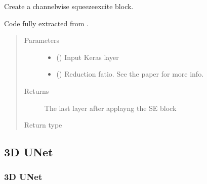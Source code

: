 \documentclass[letterpaper,10pt,english]{sphinxmanual}
\begin{document}
\begin{fulllineitems}
\label{\detokenize{models/se_unet_2d:models.se_unet_2d.squeeze_excite_block}}
Create a channel\sphinxhyphen{}wise squeeze\sphinxhyphen{}excite block.

Code fully extracted from .
\begin{quote}\begin{description}
\item[{Parameters}] \leavevmode\begin{itemize}
\item {} 
 () \textendash{} Input Keras layer

\item {} 
 () \textendash{} Reduction fatio. See the paper for more info.

\end{itemize}

\item[{Returns}] \leavevmode
{} \textendash{} The last layer after applayng the SE block

\item[{Return type}] \leavevmode
{}

\end{description}\end{quote}

\end{fulllineitems}



\subsection{3D U\sphinxhyphen{}Net}
\label{\detokenize{models/unet3d:d-u-net}}\label{\detokenize{models/unet3d::doc}}

\subsubsection{3D U\sphinxhyphen{}Net}
\label{\detokenize{models/unet_3d:module-models.unet_3d}}\label{\detokenize{models/unet_3d:d-u-net}}\label{\detokenize{models/unet_3d::doc}}
\end{document}
